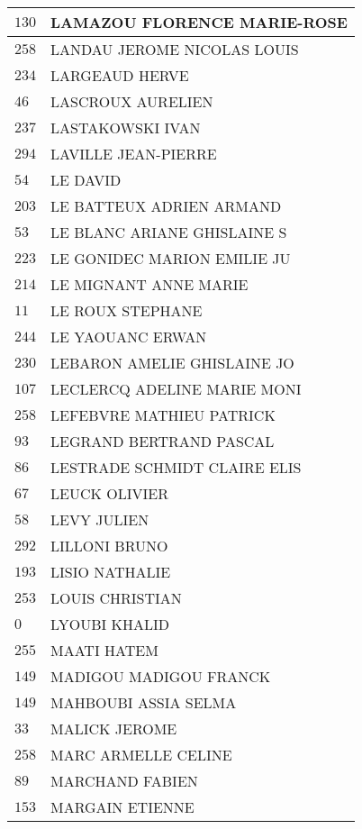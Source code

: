 \begin{xltabular}{\linewidth}{|l|X|}
    \hline
    $130$ & LAMAZOU FLORENCE MARIE-ROSE \\
    \hline
    $258$ & LANDAU JEROME NICOLAS LOUIS \\
    \hline
    $234$ & LARGEAUD HERVE \\
    \hline
    $46$ & LASCROUX AURELIEN \\
    \hline
    $237$ & LASTAKOWSKI IVAN \\
    \hline
    $294$ & LAVILLE JEAN-PIERRE \\
    \hline
    $54$ & LE DAVID \\
    \hline
    $203$ & LE BATTEUX ADRIEN ARMAND \\
    \hline
    $53$ & LE BLANC ARIANE GHISLAINE S \\
    \hline
    $223$ & LE GONIDEC MARION EMILIE JU \\
    \hline
    $214$ & LE MIGNANT ANNE MARIE \\
    \hline
    $11$ & LE ROUX STEPHANE \\
    \hline
    $244$ & LE YAOUANC ERWAN \\
    \hline
    $230$ & LEBARON AMELIE GHISLAINE JO \\
    \hline
    $107$ & LECLERCQ ADELINE MARIE MONI \\
    \hline
    $258$ & LEFEBVRE MATHIEU PATRICK \\
    \hline
    $93$ & LEGRAND BERTRAND PASCAL \\
    \hline
    $86$ & LESTRADE SCHMIDT CLAIRE ELIS \\
    \hline
    $67$ & LEUCK OLIVIER \\
    \hline
    $58$ & LEVY JULIEN \\
    \hline
    $292$ & LILLONI BRUNO \\
    \hline
    $193$ & LISIO NATHALIE \\
    \hline
    $253$ & LOUIS CHRISTIAN \\
    \hline
    $0$ & LYOUBI KHALID \\
    \hline
    $255$ & MAATI HATEM \\
    \hline
    $149$ & MADIGOU MADIGOU FRANCK \\
    \hline
    $149$ & MAHBOUBI ASSIA SELMA \\
    \hline
    $33$ & MALICK JEROME \\
    \hline
    $258$ & MARC ARMELLE CELINE \\
    \hline
    $89$ & MARCHAND FABIEN \\
    \hline
    $153$ & MARGAIN ETIENNE \\

\end{xltabular}
